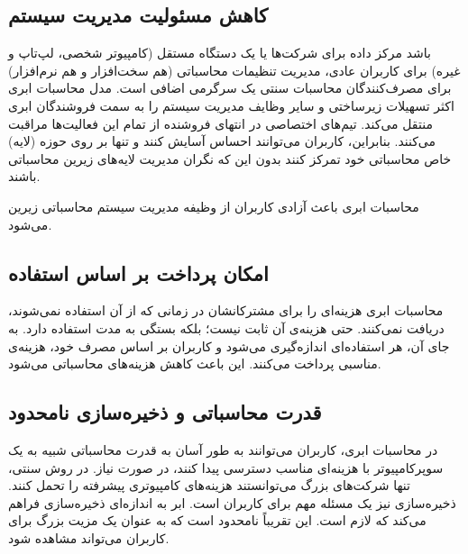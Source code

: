 \documentclass{book}
\begin{document}
            \subsection{کاهش مسئولیت مدیریت سیستم}

                باشد مرکز داده برای شرکت‌ها یا یک دستگاه مستقل (کامپیوتر شخصی، لپ‌تاپ و غیره) برای کاربران عادی، مدیریت تنظیمات محاسباتی (هم سخت‌افزار و هم نرم‌افزار) برای مصرف‌کنندگان محاسبات سنتی یک سرگرمی اضافی است. مدل محاسبات ابری اکثر تسهیلات زیرساختی و سایر وظایف مدیریت سیستم را به سمت فروشندگان ابری منتقل می‌کند. تیم‌های اختصاصی در انتهای فروشنده از تمام این فعالیت‌ها مراقبت می‌کنند. بنابراین، کاربران می‌توانند احساس آسایش کنند و تنها بر روی حوزه (لایه) خاص محاسباتی خود تمرکز کنند بدون این که نگران مدیریت لایه‌های زیرین محاسباتی باشند.

                \begin{addinfo}
                    
                    محاسبات ابری باعث آزادی کاربران از وظیفه مدیریت سیستم محاسباتی زیرین می‌شود.

                \end{addinfo}
                


    \subsection{امکان پرداخت بر اساس استفاده}

        محاسبات ابری هزینه‌ای را برای مشترکانشان در زمانی که از آن استفاده نمی‌شوند، دریافت نمی‌کنند. حتی هزینه‌ی آن ثابت نیست؛ بلکه بستگی به مدت استفاده دارد. به جای آن، هر استفاده‌ای اندازه‌گیری می‌شود و کاربران بر اساس مصرف خود، هزینه‌ی مناسبی پرداخت می‌کنند. این باعث کاهش هزینه‌های محاسباتی می‌شود.

    \subsection{قدرت محاسباتی و ذخیره‌سازی نامحدود}

        در محاسبات ابری، کاربران می‌توانند به طور آسان به قدرت محاسباتی شبیه به یک سوپرکامپیوتر با هزینه‌ای مناسب دسترسی پیدا کنند، در صورت نیاز. در روش سنتی، تنها شرکت‌های بزرگ می‌توانستند هزینه‌های کامپیوتری پیشرفته را تحمل کنند. ذخیره‌سازی نیز یک مسئله مهم برای کاربران است. ابر به اندازه‌ای ذخیره‌سازی فراهم می‌کند که لازم است. این تقریباً نامحدود است که به عنوان یک مزیت بزرگ برای کاربران می‌تواند مشاهده شود.
\end{document}

